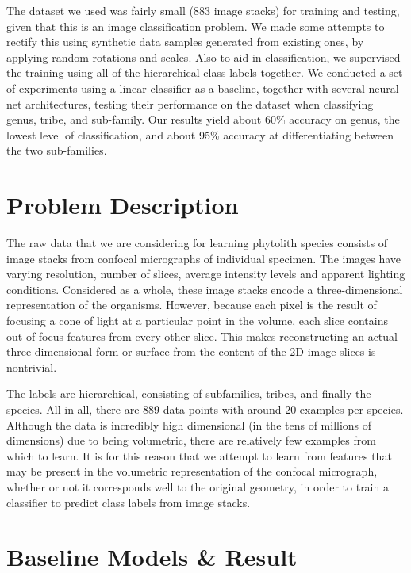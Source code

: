 \documentclass{article}
\begin{document}
The dataset we used was fairly small (883 image stacks) for training and testing, given that this is an image classification problem. We made some attempts to rectify this using synthetic data samples generated from existing ones, by applying random rotations and scales. Also to aid in classification, we supervised the training using all of the hierarchical class labels together. We conducted a set of experiments using a linear classifier as a baseline, together with several neural net architectures, testing their performance on the dataset when classifying genus, tribe, and sub-family. Our results yield about 60\% accuracy on genus, the lowest level of classification, and about 95\% accuracy at differentiating between the two sub-families.

\section{Problem Description}

The raw data that we are considering for learning phytolith species consists of image stacks from confocal micrographs of individual specimen. The images have varying resolution, number of slices, average intensity levels and apparent lighting conditions. Considered as a whole, these image stacks encode a three-dimensional representation of the organisms. However, because each pixel is the result of focusing a cone of light at a particular point in the volume, each slice contains out-of-focus features from every other slice. This makes reconstructing an actual three-dimensional form or surface from the content of the 2D image slices is nontrivial.

The labels are hierarchical, consisting of subfamilies, tribes, and finally the species. All in all, there are 889 data points with around 20 examples per species. Although the data is incredibly high dimensional (in the tens of millions of dimensions) due to being volumetric, there are relatively few examples from which to learn. It is for this reason that we attempt to learn from features that may be present in the volumetric representation of the confocal micrograph, whether or not it corresponds well to the original geometry, in order to train a classifier to predict class labels from image stacks.


\section{Baseline Models \& Result}
\end{document}
